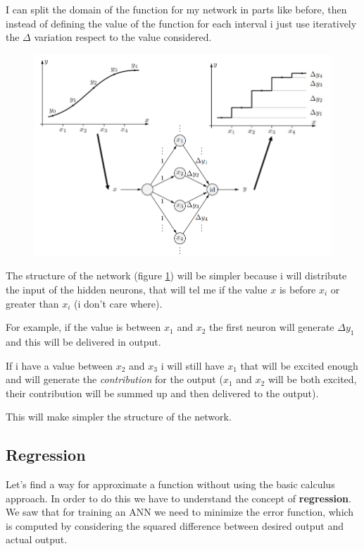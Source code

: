 \documentclass{article}
\begin{document}
I can split the domain of the function for my network in parts like before,
then instead of defining the value of the function for each interval i just
use iteratively the $\Delta$ variation respect to the value considered.

\begin{figure}[H]
    \centering
    \caption{}
    \includegraphics[scale=0.5]{images/multi-delta-integra.png}
    \label{fig:integra_delta}
\end{figure}

The structure of the network (figure \ref{fig:integra_delta}) will be simpler
because i will distribute the input of the hidden neurons,
that will tel me if the value $x$ is before $x_i$ or greater than $x_i$ (i don't care where).

For example, if the value is between $x_1$ and $x_2$ the first neuron
will generate $\Delta y_1$ and this will be delivered in output.

If i have a value between $x_2$ and $x_3$ i will still have $x_1$ that
will be excited enough and will generate the \textit{contribution}
for the output ($x_1$ and $x_2$ will be both excited, their
contribution will be summed up and then delivered to the output).

This will make simpler the structure of the network.

\subsection{Regression}
Let's find a way for approximate a function without using the basic calculus approach. In
order to do this we have to understand the concept of \textbf{regression}.
We saw that for training an ANN we need to minimize the error function, which is computed by
considering the squared difference between desired output and actual output.
\end{document}
